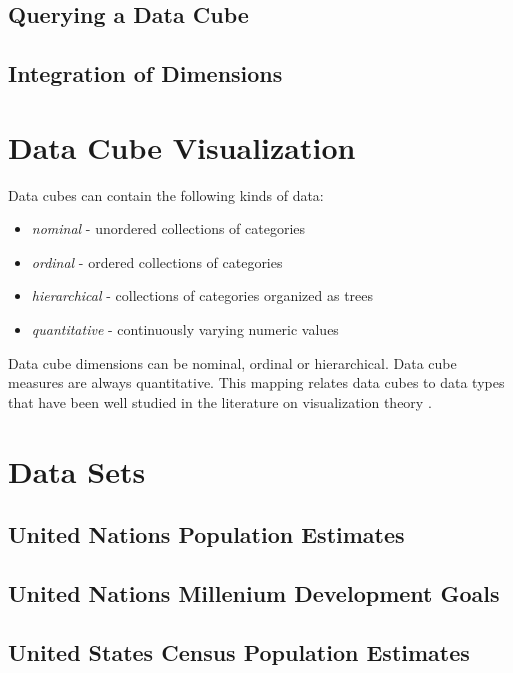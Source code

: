 \documentclass[12pt]{article}
\begin{document}
\begin{doublespace}
\subsection{Querying a Data Cube}
\subsection{Integration of Dimensions}
\pagebreak
\section{Data Cube Visualization} \label{dataCubeVisualization}
Data cubes can contain the following kinds of data:
\begin{itemize}
\item \emph{nominal} - unordered collections of categories
\item \emph{ordinal} - ordered collections of categories
\item \emph{hierarchical} - collections of categories organized as trees
\item \emph{quantitative} - continuously varying numeric values
\end{itemize}

Data cube dimensions can be nominal, ordinal or hierarchical. Data cube measures are always quantitative. This mapping relates data cubes to data types that have been well studied in the literature on visualization theory \cite{bertin1983semiology, mackinlay1986automating, graham2010survey}.



\pagebreak
\section{Data Sets}
\subsection{United Nations Population Estimates}
\subsection{United Nations Millenium Development Goals}
\subsection{United States Census Population Estimates}

\end{doublespace}
\end{document}
